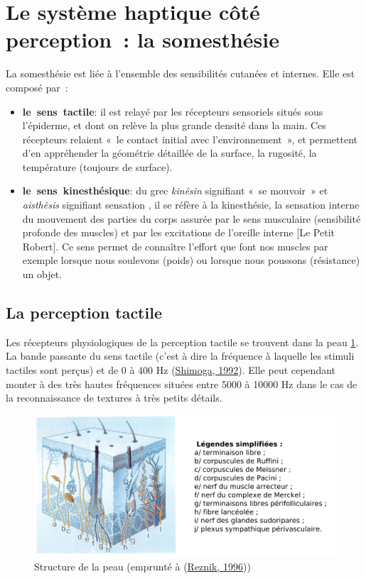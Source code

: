 \documentclass[
]{book}
\providecommand{\tightlist}{%
  \setlength{\itemsep}{0pt}\setlength{\parskip}{0pt}}
\begin{document}
\hypertarget{somesthesie}{%
\section{Le système haptique côté perception~: la somesthésie}\label{somesthesie}}

La somesthésie est liée à l'ensemble des sensibilités cutanées et
internes. Elle est composé par~:

\begin{itemize}
\tightlist
\item
  \textbf{le~sens~tactile}: il est relayé par
  les récepteurs sensoriels situés sous l'épiderme, et dont on relève la plus
  grande densité dans la main. Ces récepteurs relaient «~le contact
  initial avec l'environnement~», et permettent d'en appréhender la
  géométrie détaillée de la surface, la rugosité, la température (toujours de
  surface).
\item
  \textbf{le~sens~kinesthésique}: du grec
  \emph{kinêsin} signifiant «~se mouvoir~» et
  \emph{aisthêsis} signifiant sensation , il se réfère à
  la kinesthésie, la sensation interne du mouvement des parties du corps
  assurée par le sens musculaire (sensibilité profonde des muscles) et par
  les excitations de l'oreille interne {[}Le Petit Robert{]}. Ce sens permet de
  connaître l'effort que font nos muscles par exemple lorsque nous soulevons
  (poids) ou lorsque nous poussons (résistance) un objet.
\end{itemize}

\hypertarget{la-perception-tactile}{%
\subsection{La perception tactile}\label{la-perception-tactile}}

Les récepteurs physiologiques de la perception tactile se trouvent dans la
peau \ref{fig:Structure-de-la}. La bande passante
du sens tactile (c'est à dire la fréquence à laquelle les stimuli tactiles
sont perçus) et de 0 à 400 Hz (\href{047-bibliographie.html\#Shimoga1992}{Shimoga,
1992}). Elle peut cependant monter à des très hautes fréquences situées
entre 5000 à 10000 Hz dans le cas de la reconnaissance de textures à très
petits détails.

\begin{figure}
\centering
\includegraphics{img/peau.png}
\caption{\label{fig:Structure-de-la} Structure de la
peau (emprunté à (\protect\hyperlink{ref-reznik1996structure}{Reznik, 1996}))}
\end{figure}
\end{document}
